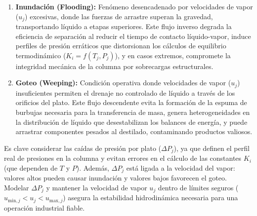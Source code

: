 \begin{enumerate}
    \item \textbf{Inundación (Flooding):} Fenómeno desencadenado por velocidades de vapor ($u_{j}$) excesivas, donde las fuerzas de arrastre superan la gravedad, transportando líquido a etapas superiores. Este flujo inverso degrada la eficiencia de separación al reducir el tiempo de contacto líquido-vapor, induce perfiles de presión erráticos que distorsionan los cálculos de equilibrio termodinámico ($K_i = f(T_j, P_j)$), y en casos extremos, compromete la integridad mecánica de la columna por sobrecargas estructurales.
    \item \textbf{Goteo (Weeping):} Condición operativa donde velocidades de vapor ($u_{j}$) insuficientes permiten el drenaje no controlado de líquido a través de los orificios del plato. Este flujo descendente evita la formación de la espuma de burbujas necesaria para la transferencia de masa, genera heterogeneidades en la distribución de líquido que desestabilizan los balances de energía, y puede arrastrar componentes pesados al destilado, contaminando productos valiosos.
\end{enumerate}

Es clave considerar las caídas de presión por plato ($\Delta P_{j}$), ya que definen el perfil real de presiones en la columna y evitan errores en el cálculo de las constantes $K_{i}$ (que dependen de $T$ y $P$). Además, $\Delta P_{j}$ está ligada a la velocidad del vapor: valores altos pueden causar inundación y valores bajos favorecen el goteo. Modelar $\Delta P_{j}$ y mantener la velocidad de vapor $u_{j}$ dentro de límites seguros ($u_{\mathrm{min},j} < u_{j} < u_{\mathrm{max},j}$) asegura la estabilidad hidrodinámica necesaria para una operación industrial fiable.


